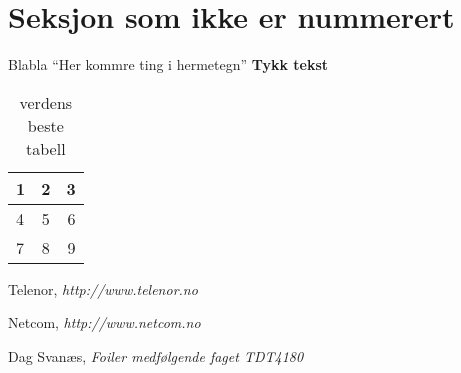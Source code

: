 \documentclass[titlepage]{article}
\begin{document}
\newpage

\section*{Seksjon som ikke er nummerert}
Blabla
``Her kommre ting i hermetegn'' %
\textbf{Tykk tekst}




\begin{table}[H]
   \centering
   \label{tab:lulz}
   \begin{tabular}{| l | c | r |}
      \hline
      1 & 2 & 3 \\
      \hline
      4 & 5 & 6 \\
      \hline
      7 & 8 & 9 \\
      \hline
   \end{tabular}
   \caption{verdens beste tabell}
\end{table}


%

\newpage
\begin{thebibliography}{9}

	Telenor,
	\emph{http://www.telenor.no}

	Netcom,
	\emph{http://www.netcom.no}

	Dag Svanæs,
	\emph{Foiler medfølgende faget TDT4180}
\end{thebibliography}
\end{document}
